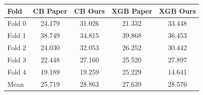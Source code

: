 \begin{tabular}{lcccc}
\toprule
Fold & CB Paper & CB Ours & XGB Paper & XGB Ours \\ \midrule
Fold 0 & 24.179 & 31.026 & 21.332 & 33.448 \\
Fold 1 & 38.749 & 34.815 & 39.868 & 36.453 \\
Fold 2 & 24.030 & 32.053 & 26.252 & 30.442 \\
Fold 3 & 22.448 & 27.160 & 25.520 & 27.897 \\
Fold 4 & 19.189 & 19.259 & 25.229 & 14.641 \\
Mean & 25.719 & 28.863 & 27.639 & 28.576 \\
\bottomrule
\end{tabular}
